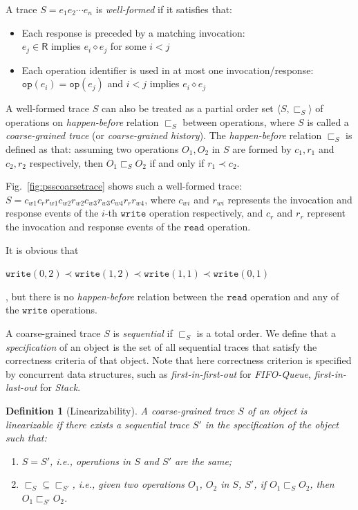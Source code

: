 \documentclass[runningheads]{llncs}
\newcommand{\eresp}{\mathsf{R}}
\newcommand{\pair}[1]{{\langle{#1}\rangle}}
\newtheorem{myDef}{Definition}
\newcommand{\wri}{\mathtt{write}}
\newcommand{\rea}{\mathtt{read}}
\newcommand{\hb}{\textit{happen-before }}
\begin{document}
 A trace $S = e_1e_2\cdots e_n$ is \textit{well-formed} if it satisfies that:
\begin{itemize}
  \item Each response is preceded by a matching invocation:\\
  $e_j\in \eresp$ implies $e_i \diamond e_j$ for some $i<j$
  \item Each operation identifier is used in at most one invocation/response:\\
  $\mathtt{op}(e_i)=\mathtt{op}(e_j)$ and $i<j$ implies $e_i \diamond e_j$
\end{itemize}
 A well-formed trace $S$ can also be treated as a partial order set $\pair{S,\sqsubset_S}$ of operations on \textit{happen-before} relation $\sqsubset_S$ between operations, where $S$ is called a \textit{coarse-grained trace} (or \textit{coarse-grained history}). The \textit{happen-before} relation $\sqsubset_S$ is defined as that: assuming two operations $O_1,O_2$ in $S$ are formed by $c_1,r_1$ and $c_2,r_2$ respectively, then $O_1\sqsubset_S O_2$ if and only if $r_1\prec c_2$.

\begin{example}
Fig.~\ref{fig:psscoarsetrace} shows such a well-formed trace:
$S = c_{w1}c_rr_{w1}c_{w2}r_{w2}c_{w3}r_{w3}c_{w4}r_{r}r_{w4}$, where $c_{wi}$ and $r_{wi}$
represents the invocation and response events of the $i$-th $\mathtt{write}$ operation respectively, and
$c_r$ and $r_r$ represent the invocation and response events of the $\mathtt{read}$ operation.

It is obvious that \begin{small}$\wri(0,2)\prec \wri(1,2)\prec \wri(1,1)\prec \wri(0,1)$\end{small}, 
but there is no \hb  
relation between the $\rea$ operation and any of the $\wri$ operations.

\end{example}




A coarse-grained trace $S$ is \textit{sequential} if $\sqsubset_S$ is a total order. 
We define that a \textit{specification} of an object is the set of all sequential traces that satisfy the correctness criteria of that object. 
Note that here correctness criterion is specified by concurrent data structures, such as \textit{first-in-first-out} for \textit{FIFO-Queue}, \textit{first-in-last-out} for \textit{Stack}.

\begin{myDef}[Linearizability]\label{def:linearizability}
A coarse-grained trace $S$ of an object is linearizable if there exists a sequential trace $S'$ in the specification of the object such that:
\begin{enumerate}
  \item $S = S'$, i.e., operations in $S$ and $S'$ are the same;
  \item $\sqsubset_S \subseteq \sqsubset_{S'}$, i.e., given two operations $O_1$, $O_2$ in $S$, $S'$, if $O_1\sqsubset_S O_2$, then $O_1\sqsubset_{S'} O_2$.
\end{enumerate}
\end{myDef}
\end{document}
